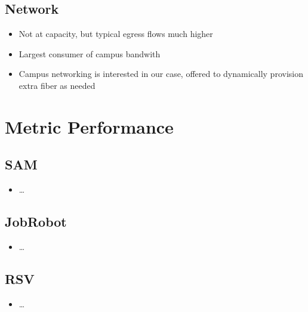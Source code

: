 \documentclass{beamer}
\begin{document}
\subsection{Network}
\begin{frame}
\begin{itemize}
    \item Not at capacity, but typical egress flows much higher
    \item Largest consumer of campus bandwith
    \item Campus networking is interested in our case, offered to dynamically provision extra fiber as needed
\end{itemize}
\end{frame}

\section{Metric Performance}
\subsection{SAM}
\begin{frame}
\begin{itemize}
    \item \ldots{}
\end{itemize}
\end{frame}

\subsection{JobRobot}
\begin{frame}
\begin{itemize}
    \item \ldots{}
\end{itemize}
\end{frame}

\subsection{RSV}
\begin{frame}
\begin{itemize}
    \item \ldots{}
\end{itemize}
\end{frame}
\end{document}
